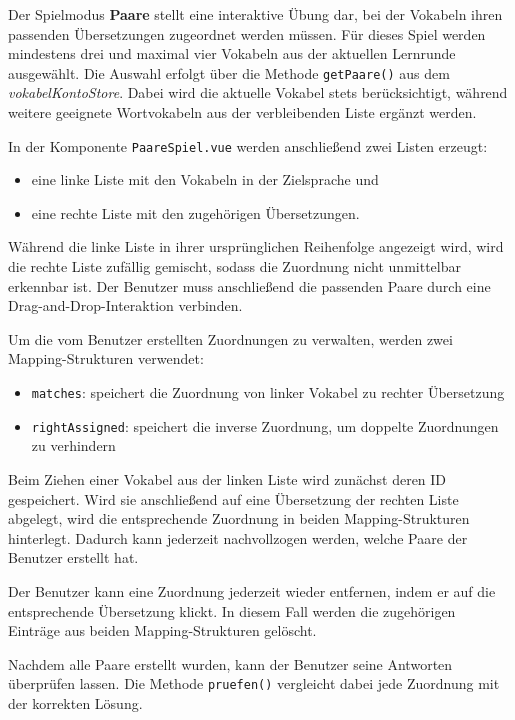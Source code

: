 Der Spielmodus \textbf{Paare} stellt eine interaktive Übung dar, bei der Vokabeln ihren passenden Übersetzungen zugeordnet werden müssen. 
Für dieses Spiel werden mindestens drei und maximal vier Vokabeln aus der aktuellen Lernrunde ausgewählt. 
Die Auswahl erfolgt über die Methode \texttt{getPaare()} aus dem \textit{vokabelKontoStore}. 
Dabei wird die aktuelle Vokabel stets berücksichtigt, während weitere geeignete Wortvokabeln aus der verbleibenden Liste ergänzt werden.

In der Komponente \texttt{PaareSpiel.vue} werden anschließend zwei Listen erzeugt:

\begin{itemize}
\item eine linke Liste mit den Vokabeln in der Zielsprache und
\item eine rechte Liste mit den zugehörigen Übersetzungen.
\end{itemize}

Während die linke Liste in ihrer ursprünglichen Reihenfolge angezeigt wird, wird die rechte Liste zufällig gemischt, sodass die Zuordnung nicht unmittelbar erkennbar ist. 
Der Benutzer muss anschließend die passenden Paare durch eine Drag-and-Drop-Interaktion verbinden.

Um die vom Benutzer erstellten Zuordnungen zu verwalten, werden zwei Mapping-Strukturen verwendet:

\begin{itemize}
\item \texttt{matches}: speichert die Zuordnung von linker Vokabel zu rechter Übersetzung
\item \texttt{rightAssigned}: speichert die inverse Zuordnung, um doppelte Zuordnungen zu verhindern
\end{itemize}

Beim Ziehen einer Vokabel aus der linken Liste wird zunächst deren ID gespeichert. 
Wird sie anschließend auf eine Übersetzung der rechten Liste abgelegt, wird die entsprechende Zuordnung in beiden Mapping-Strukturen hinterlegt. 
Dadurch kann jederzeit nachvollzogen werden, welche Paare der Benutzer erstellt hat.

Der Benutzer kann eine Zuordnung jederzeit wieder entfernen, indem er auf die entsprechende Übersetzung klickt. 
In diesem Fall werden die zugehörigen Einträge aus beiden Mapping-Strukturen gelöscht.

Nachdem alle Paare erstellt wurden, kann der Benutzer seine Antworten überprüfen lassen. 
Die Methode \texttt{pruefen()} vergleicht dabei jede Zuordnung mit der korrekten Lösung.

